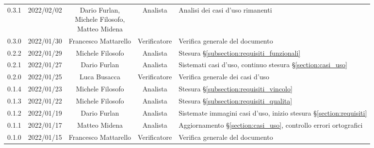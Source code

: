 \begin{center}
\begin{longtable}[c]{c | c | c | c | p{5cm}}
		0.3.1                                                      & 2022/02/02 & \shortstack{Dario Furlan,                                                                                                                          \\ Michele Filosofo,\\ Matteo Midena} & Analista & Analisi dei casi d'uso rimanenti \\
		0.3.0                                                      & 2022/01/30 & Francesco Mattarello      & Verificatore & Verifica generale del documento                                                                         \\
		0.2.2                                                      & 2022/01/29 & Michele Filosofo          & Analista     & Stesura §\ref{subsection:requisiti_funzionali}                                                          \\
		0.2.1                                                      & 2022/01/27 & Dario Furlan              & Analista     & Sistemati casi d'uso, continuo stesura §\ref{section:casi_uso}                                          \\
		0.2.0                                                      & 2022/01/25 & Luca Busacca              & Verificatore & Verifica generale dei casi d'uso                                                                        \\
		0.1.4                                                      & 2022/01/23 & Michele Filosofo          & Analista     & Stesura §\ref{subsection:requisiti_vincolo}                                                             \\
		0.1.3                                                      & 2022/01/22 & Michele Filosofo          & Analista     & Stesura §\ref{subsection:requisiti_qualita}                                                             \\
		0.1.2                                                      & 2022/01/19 & Dario Furlan              & Analista     & Sistemate immagini casi d'uso, inizio stesura §\ref{section:requisiti}                                  \\
		0.1.1                                                      & 2022/01/17 & Matteo Midena             & Analista     & Aggiornamento §\ref{section:casi_uso}, controllo errori ortografici                                     \\
		0.1.0                                                      & 2022/01/15 & Francesco Mattarello      & Verificatore & Verifica generale del documento                                                                         \\

\end{longtable}
\end{center}
